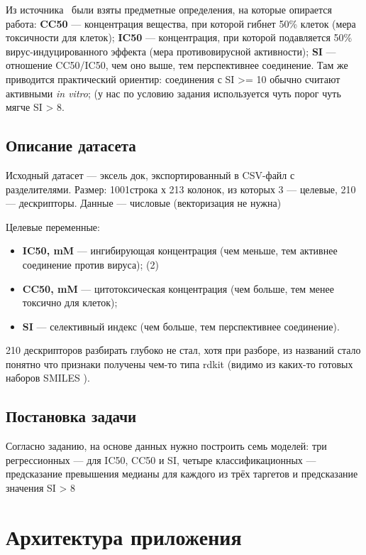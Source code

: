 \documentclass[12pt,a4paper]{report}
\begin{document}
Из источника~\cite{cc50-ic50} были взяты предметные определения, на которые опирается работа: \textbf{CC50} --- концентрация вещества, при которой гибнет 50\% клеток (мера токсичности для клеток); \textbf{IC50} --- концентрация, при которой подавляется 50\% вирус-индуцированного эффекта (мера противовирусной активности); \textbf{SI} --- отношение CC50/IC50, чем оно выше, тем перспективнее соединение. Там же приводится практический ориентир: соединения с SI >= 10 обычно считают активными \emph{in vitro}; (у нас по условию задания используется чуть порог чуть мягче SI > 8.

\section{Описание датасета}

Исходный датасет --- эксель док, экспортированный в CSV-файл с разделителями. Размер: 1001строка х 213 колонок, из которых 3 --- целевые, 210 --- дескрипторы. Данные --- числовые (векторизация не нужна)

Целевые переменные:
\begin{itemize}
    \item \textbf{IC50, mM} ---  ингибирующая концентрация (чем меньше, тем активнее соединение против вируса); (2)
    \item \textbf{CC50, mM} --- цитотоксическая концентрация (чем больше, тем менее токсично для клеток);
    \item \textbf{SI} --- селективный индекс (чем больше, тем перспективнее соединение).
\end{itemize}

210 дескрипторов разбирать глубоко не стал, хотя при разборе, из названий стало понятно что признаки получены чем-то типа  rdkit (видимо из каких-то готовых наборов SMILES ).

\section{Постановка задачи}

Согласно заданию, на основе данных нужно построить семь моделей: три регрессионных --- для IC50, CC50 и SI, четыре классификационных --- предсказание превышения медианы для каждого из трёх таргетов и предсказание значения SI > 8

\chapter{Архитектура приложения}
\end{document}
